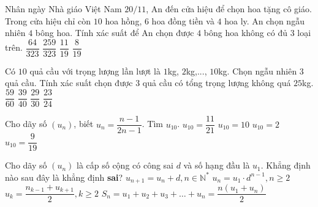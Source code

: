 \begin{ex}%
	Nhân ngày Nhà giáo Việt Nam $20/11$, An đến cửa hiệu để chọn hoa tặng cô giáo. Trong cửa hiệu chỉ còn $10$ hoa hồng, $6$ hoa đồng tiền và $4$ hoa ly. An chọn ngẫu nhiên $4$ bông hoa. Tính xác suất để An chọn được $4$ bông hoa không có đủ $3$ loại trên.
	\choice
	{$\dfrac{64}{323}$}
	{$\dfrac{259}{323}$}
	{\True $\dfrac{11}{19}$}
	{$\dfrac{8}{19}$}
\end{ex}
\begin{ex}%
	Có $10$ quả cầu với trọng lượng lần lượt là $1$kg, $2$kg,$...$, $10$kg. Chọn ngẫu nhiên $3$ quả cầu. Tính xác suất chọn được $3$ quả cầu có tổng trọng lượng không quá $25$kg.
	\choice
	{\True $\dfrac{59}{60}$}
	{$\dfrac{39}{40}$}
	{$\dfrac{29}{30}$}
	{$\dfrac{23}{24}$}
\end{ex}
\begin{ex}%
	Cho dãy số $ (u_n) $, biết $ u_n=\dfrac{n-1}{2n-1} $. Tìm $ u_{10} $.
	\choice
	{$ u_{10}=\dfrac{11}{21} $}
	{$ u_{10}=10 $}
	{$ u_{10}=2 $}
	{\True $ u_{10}=\dfrac{9}{19} $}
\end{ex}
\begin{ex}%
	Cho dãy số $ (u_n) $ là cấp số cộng có công sai $ d $ và số hạng đầu là $ u_1 $. Khẳng định nào sau đây là khẳng định \textbf{sai}?
	\choice
	{$ u_{n+1}=u_n+d,n\in\mathbb{N}^* $}
	{\True $ u_n=u_1 \cdot d^{n-1},n\ge2$}
	{$ u_k=\dfrac{n_{k-1}+u_{k+1}}{2},k\ge2 $}
	{$ S_n=u_1+u_2+u_3+\ldots+u_n=\dfrac{n(u_1+u_n)}{2} $}
\end{ex}
